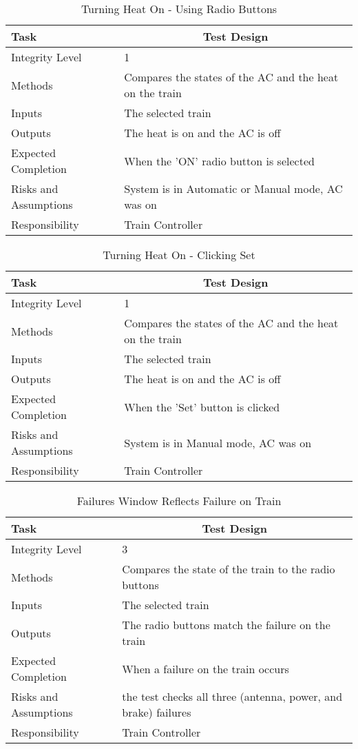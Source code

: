 \documentclass[]{article}
\begin{document}
\begin{table}[H]
	\centering
	\caption{Turning Heat On - Using Radio Buttons}
	\begin{tabular}{|l|l|}
		\hline
		Task & \multicolumn{1}{c|}{Test Design} \\ \hline
		Integrity Level & 1 \\ \hline
		Methods & Compares the states of the AC and the heat on the train\\ \hline
		Inputs & The selected train\\ \hline
		Outputs & The heat is on and the AC is off\\ \hline
		Expected Completion & When the 'ON' radio button is selected\\ \hline
		Risks and Assumptions & System is in Automatic or Manual mode, AC was on \\ \hline
		Responsibility &  Train Controller\\ \hline
	\end{tabular}
\end{table}

\begin{table}[H]
	\centering
	\caption{Turning Heat On - Clicking Set}
	\begin{tabular}{|l|l|}
		\hline
		Task & \multicolumn{1}{c|}{Test Design} \\ \hline
		Integrity Level & 1 \\ \hline
		Methods & Compares the states of the AC and the heat on the train\\ \hline
		Inputs & The selected train\\ \hline
		Outputs & The heat is on and the AC is off \\ \hline
		Expected Completion & When the 'Set' button is clicked\\ \hline
		Risks and Assumptions & System is in Manual mode, AC was on \\ \hline
		Responsibility &  Train Controller\\ \hline
	\end{tabular}
\end{table}

\begin{table}[H]
	\centering
	\caption{Failures Window Reflects Failure on Train}
	\begin{tabular}{|l|l|}
		\hline
		Task & \multicolumn{1}{c|}{Test Design} \\ \hline
		Integrity Level & 3 \\ \hline
		Methods & Compares the state of the train to the radio buttons\\ \hline
		Inputs & The selected train\\ \hline
		Outputs & The radio buttons match the failure on the train\\ \hline
		Expected Completion & When a failure on the train occurs\\ \hline
		Risks and Assumptions & the test checks all three (antenna, power, and brake) failures \\ \hline
		Responsibility & Train Controller\\ \hline
	\end{tabular}
\end{table}
\end{document}
